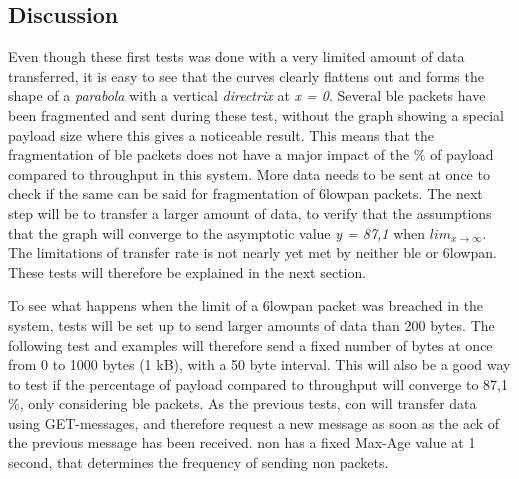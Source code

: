 \subsection{Discussion}

\noindent Even though these first tests was done with a very limited amount of data transferred, it is easy to see that the curves clearly flattens out and forms the shape of a \textit{parabola} with a vertical \textit{directrix} at \textit{x = 0}. Several \gls{ble} packets have been fragmented and sent during these test, without the graph showing a special \gls{payload} size where this gives a noticeable result. This means that the fragmentation of \gls{ble} packets does not have a major impact of the \% of payload compared to throughput in this system. More data needs to be sent at once to check if the same can be said for fragmentation of \gls{6lowpan} packets. The next step will be to transfer a larger amount of data, to verify that the assumptions that the graph will converge to the asymptotic value \textit{y = 87,1} when $lim_{x\to\infty}$. The limitations of transfer rate is not nearly yet met by neither \gls{ble} or \gls{6lowpan}.  These tests will therefore be explained in the next section. 



\noindent To see what happens when the limit of a \gls{6lowpan} packet was breached in the system, tests will be set up to send larger amounts of data than 200 bytes. The following test and examples will therefore send a fixed number of bytes at once from 0 to 1000 bytes (1 kB), with a 50 byte interval. This will also be a good way to test if the percentage of \gls{payload} compared to \gls{throughput} will converge to 87,1 \%, only considering \gls{ble} packets. As the previous tests, \gls{con} will transfer data using GET-messages, and therefore request a new message as soon as the \gls{ack} of the previous message has been received. \gls{non} has a fixed Max-Age value at 1 second, that determines the frequency of sending \gls{non} packets. 


